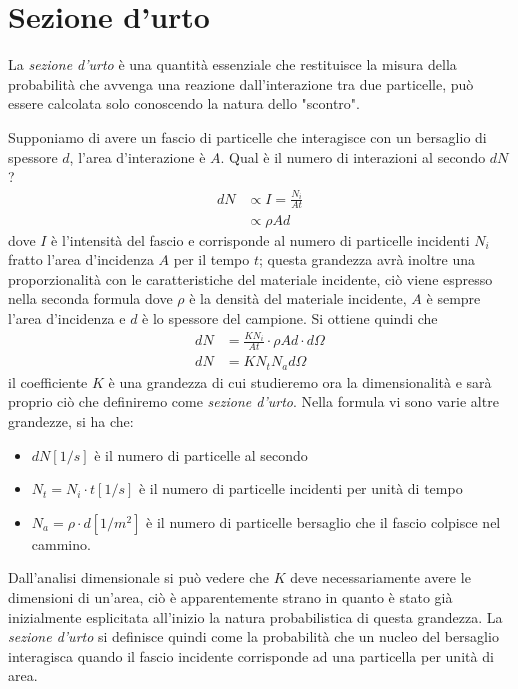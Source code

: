 
\section{Sezione d'urto}

La \emph{sezione d'urto} è una quantità essenziale che restituisce la misura della probabilità che avvenga una reazione dall'interazione tra due particelle, può essere calcolata solo conoscendo la natura dello "scontro".

Supponiamo di avere un fascio di particelle che interagisce con un bersaglio di spessore $d$, l'area d'interazione è $A$.
Qual è il numero di interazioni al secondo $dN$?
\begin{equation}
\begin{split}
dN &\propto I=\frac{N_i}{At}\\
&\propto \rho A d
\end{split}
\end{equation}
dove $I$ è l'intensità del fascio e corrisponde al numero di particelle incidenti $N_i$ fratto l'area d'incidenza $A$ per il tempo $t$; questa grandezza avrà inoltre una proporzionalità con le caratteristiche del materiale incidente, ciò viene espresso nella seconda formula dove $\rho$ è la densità del materiale incidente, $A$ è sempre l'area d'incidenza e $d$ è lo spessore del campione.
Si ottiene quindi che 
\begin{equation}
\begin{split}
dN &=\frac{KN_i}{At}\cdot\rho Ad\cdot d\Omega\\
dN &=KN_tN_ad\Omega
\end{split}
\end{equation}
il coefficiente $K$ è una grandezza di cui studieremo ora la dimensionalità e sarà proprio ciò che definiremo come \emph{sezione d'urto}.
Nella formula vi sono varie altre grandezze, si ha che:
\begin{itemize}
\item $dN [1/s]$ è il numero di particelle al secondo
\item $N_t=N_i\cdot t [1/s]$ è il numero di particelle incidenti per unità di tempo
\item $N_a=\rho \cdot d[1/m^2]$ è il numero di particelle bersaglio che il fascio colpisce nel cammino.
\end{itemize}
Dall'analisi dimensionale si può vedere che $K$ deve necessariamente avere le dimensioni di un'area, ciò è apparentemente strano in quanto è stato già inizialmente esplicitata all'inizio la natura probabilistica di questa grandezza.
La \emph{sezione d'urto} si definisce quindi come la probabilità che un nucleo del bersaglio interagisca quando il fascio incidente corrisponde ad una particella per unità di area.

